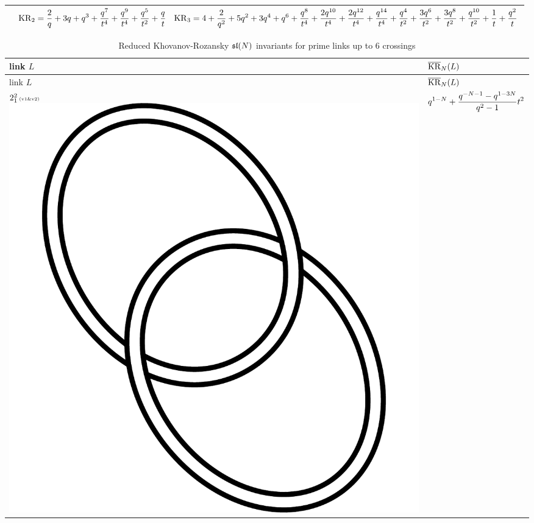\documentclass{compositio}
\theoremstyle{definition}
\numberwithin{equation}{section}
\begin{document}
{\begin{longtable}{p{}|p{}}
& 
$
\displaystyle{%
\KR_{2} = \frac{2}{q}+3 q+q^3+\frac{q^7}{t^4}+\frac{q^9}{t^4}+\frac{q^5}{t^2}+\frac{q}{t}
}
$
\newline 
$
\displaystyle{%
\KR_{3} = 4+\frac{2}{q^2}+5 q^2+3 q^4+q^6+\frac{q^8}{t^4}+\frac{2 q^{10}}{t^4}+\frac{2 q^{12}}{t^4}+\frac{q^{14}}{t^4}+\frac{q^4}{t^2}+\frac{3 q^6}{t^2}+\frac{3 q^8}{t^2}+\frac{q^{10}}{t^2}+\frac{1}{t}+\frac{q^2}{t}
}
$
\\
\hline
\end{longtable}
}




{\footnotesize 
\begin{longtable}{p{}|p{}} 
\caption{Reduced Khovanov-Rozansky $\mathfrak{sl}(N)$ invariants for prime links up to 6 crossings} \\
\label{reducedKR}
link $L$ & $\overline{\operatorname{KR}}_{N}(L)$ \\
\hline\hline
\endfirsthead
link $L$ & $\overline{\operatorname{KR}}_{N}(L)$ \\
\hline\hline
\endhead
\hline\hline
\endfoot
$2_{1}^2\,\text{{\tiny (v1\&v2)}}$ 
\includegraphics[scale=0.07,angle=0]{link2_1_2.pdf} 
& 
$
\displaystyle{%
q^{1-N} + \frac{q^{-N-1}-q^{1-3 N}}{q^2-1} t^2
}
$
\newline\newline\newline\newline

\end{longtable}}
\end{document}
